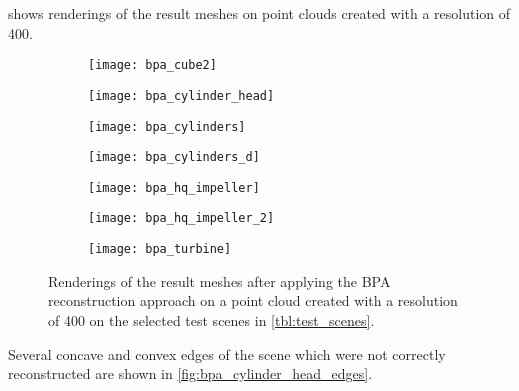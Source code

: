  shows renderings of the result meshes on point clouds created with a resolution of 400.

\begin{figure}
	\centering
	\begin{subfigure}[b]{0.34\textwidth}
		\centering
		\texttt{[image: bpa\_cube2]}
		\caption{\cubes}
		\label{fig:bpa_cube2}
	\end{subfigure}
	\hspace{1cm}
	\begin{subfigure}[b]{0.34\textwidth}
		\centering
		\texttt{[image: bpa\_cylinder\_head]}
		\caption{\cylinderhead}
		\label{fig:bpa_cylinder_head}
	\end{subfigure}
	\begin{subfigure}[b]{0.34\textwidth}
		\centering
		\texttt{[image: bpa\_cylinders]}
		\caption{\cylinders}
		\label{fig:bpa_cylinders}
	\end{subfigure}
	\hspace{1cm}
	\begin{subfigure}[b]{0.34\textwidth}
		\centering
		\texttt{[image: bpa\_cylinders\_d]}
		\caption{\cylindersd}
		\label{fig:bpa_cylinders_d}
	\end{subfigure}
	\begin{subfigure}[b]{0.34\textwidth}
		\centering
		\texttt{[image: bpa\_hq\_impeller]}
		\caption{\impeller}
		\label{fig:bpa_hq_impeller}
	\end{subfigure}
	\hspace{1cm}
	\begin{subfigure}[b]{0.34\textwidth}
		\centering
		\texttt{[image: bpa\_hq\_impeller\_2]}
		\caption{\impellerhalf}
		\label{fig:bpa_hq_impeller_2}
	\end{subfigure}
	\begin{subfigure}[b]{0.33\textwidth}
		\centering
		\texttt{[image: bpa\_turbine]}
		\caption{\turbine}
		\label{fig:bpa_turbine}
	\end{subfigure}
	\caption{
		Renderings of the result meshes after applying the BPA reconstruction approach on a point cloud created with a resolution of 400 on the selected test scenes in \cref{tbl:test_scenes}.
	}
	\label{fig:bpa_results}
\end{figure}

Several concave and convex edges of the \cylinderhead scene which were not correctly reconstructed are shown in \cref{fig:bpa_cylinder_head_edges}.

